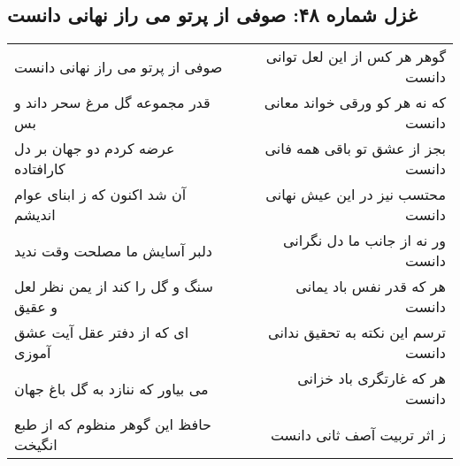 \begin{center}
\section*{غزل شماره ۴۸: صوفی از پرتو می راز نهانی دانست}
\label{sec:sh048}
\begin{longtable}{l p{0.5cm} r}
صوفی از پرتو می راز نهانی دانست
&&
گوهر هر کس از این لعل توانی دانست
\\
قدر مجموعه گل مرغ سحر داند و بس
&&
که نه هر کو ورقی خواند معانی دانست
\\
عرضه کردم دو جهان بر دل کارافتاده
&&
بجز از عشق تو باقی همه فانی دانست
\\
آن شد اکنون که ز ابنای عوام اندیشم
&&
محتسب نیز در این عیش نهانی دانست
\\
دلبر آسایش ما مصلحت وقت ندید
&&
ور نه از جانب ما دل نگرانی دانست
\\
سنگ و گل را کند از یمن نظر لعل و عقیق
&&
هر که قدر نفس باد یمانی دانست
\\
ای که از دفتر عقل آیت عشق آموزی
&&
ترسم این نکته به تحقیق ندانی دانست
\\
می بیاور که ننازد به گل باغ جهان
&&
هر که غارتگری باد خزانی دانست
\\
حافظ این گوهر منظوم که از طبع انگیخت
&&
ز اثر تربیت آصف ثانی دانست
\\
\end{longtable}
\end{center}

